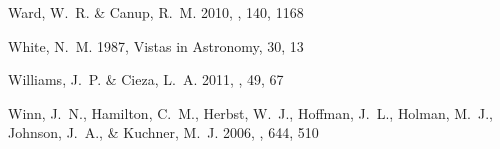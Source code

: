 \documentclass{emulateapj}
\begin{document}
\begin{thebibliography}{45}
{Ward}, W.~R. \& {Canup}, R.~M. 2010, \aj, 140, 1168

{White}, N.~M. 1987, Vistas in Astronomy, 30, 13

{Williams}, J.~P. \& {Cieza}, L.~A. 2011, \araa, 49, 67

{Winn}, J.~N., {Hamilton}, C.~M., {Herbst}, W.~J., {Hoffman}, J.~L., {Holman},
  M.~J., {Johnson}, J.~A., \& {Kuchner}, M.~J. 2006, \apj, 644, 510

\end{thebibliography}
\end{document}
